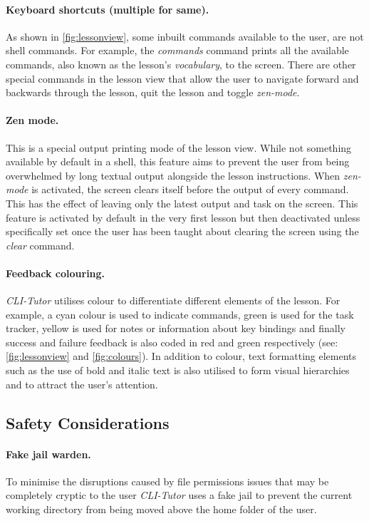 \paragraph{Keyboard shortcuts (multiple for same).} As shown in
\autoref{fig:lessonview}, some inbuilt commands available to the user, are
not shell commands. For example, the \textit{commands} command prints all the
available commands, also known as the lesson's \textit{vocabulary}, to the
screen. There are other special commands in the lesson view that allow the user
to navigate forward and backwards through the lesson, quit the lesson and
toggle \textit{zen-mode}.

\paragraph{Zen mode.} This is a special output printing mode of the lesson
view. While not something available by default in a shell, this feature aims to
prevent the user from being overwhelmed by long textual output alongside the
lesson instructions. When \textit{zen-mode} is activated, the screen clears
itself before the output of every command. This has the effect of leaving only
the latest output and task on the screen. This feature is activated by default
in the very first lesson but then deactivated unless specifically set once the
user has been taught about clearing the screen using the \textit{clear}
command.

\paragraph{Feedback colouring.} \textit{CLI-Tutor} utilises colour to
differentiate different elements of the lesson. For example, a cyan colour is
used to indicate commands, green is used for the task tracker, yellow is used
for notes or information about key bindings and finally success and failure
feedback is also coded in red and green respectively (see:
\autoref{fig:lessonview} and \autoref{fig:colours}). In addition to colour,
text formatting elements such as the use of bold and italic text is also
utilised to form visual hierarchies and to attract the user's attention.


\subsection{Safety Considerations}

\paragraph{Fake jail warden.} To minimise the disruptions caused by
file permissions issues that may be completely cryptic to the user
\textit{CLI-Tutor}  uses a fake jail to prevent the current working directory
from being moved above the home folder of the user.

